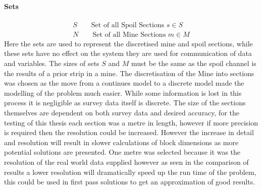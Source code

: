 \paragraph*{Sets}
\begin{align}
\label{MIP:Set:S}
S\qquad \text{Set of all Spoil Sections   } s\in S\\
\label{MIP:Set:N}
N\qquad \text{Set  of all Mine Sections } m \in M
\end{align}
Here the sets are used to represent the discretised mine and spoil sections, while these sets have no effect on the system they are used for communication of data and variables. The sizes of sets $S$ and $M$ must be the same as the spoil channel is the results of a prior strip in a mine. The discretisation of the Mine into sections was chosen as the move from a continues model to a discrete model made the modelling of the problem much easier. While some information is lost in this process it is negligible as survey data itself is discrete. The size of the sections themselves are dependent on both survey data and desired accuracy, for the testing of this thesis each section was a metre in length, however if more precision is required then the resolution could be increased. However the increase in detail and resolution will result in slower calculations of block dimensions as more potential solutions are presented. One metre was selected because it was the resolution of the real world data supplied however as seen in the comparison of results a lower resolution will dramatically speed up the run time of the problem, this could be used in first pass solutions to get an approximation of good results. 
